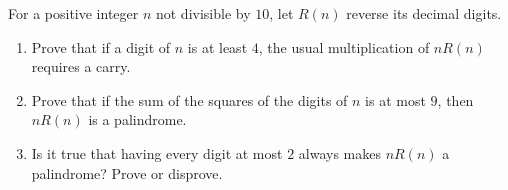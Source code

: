 For a positive integer $n$ not divisible by $10$, let $R(n)$ reverse its decimal digits.
\begin{enumerate}
\item Prove that if a digit of $n$ is at least $4$, the usual multiplication of $nR(n)$ requires a carry.
\item Prove that if the sum of the squares of the digits of $n$ is at most $9$, then $nR(n)$ is a palindrome.
\item Is it true that having every digit at most $2$ always makes $nR(n)$ a palindrome? Prove or disprove.
\end{enumerate}
